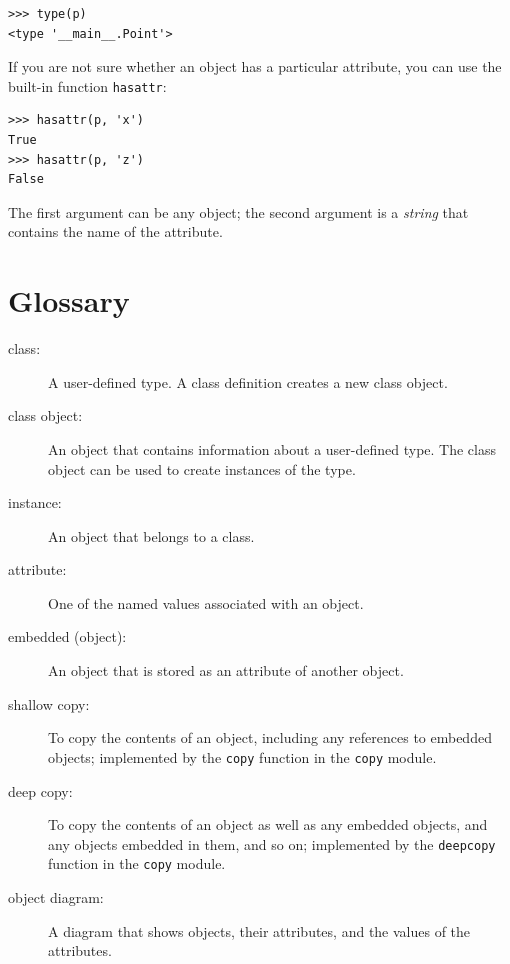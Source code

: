 \documentclass[10pt]{book}
\begin{document}
\beforeverb
\begin{verbatim}
>>> type(p)
<type '__main__.Point'>
\end{verbatim}
\afterverb
%
If you are not sure whether an object has a particular attribute,
you can use the built-in function {\tt hasattr}:


\beforeverb
\begin{verbatim}
>>> hasattr(p, 'x')
True
>>> hasattr(p, 'z')
False
\end{verbatim}
\afterverb
%
The first argument can be any object; the second argument is a {\em
string} that contains the name of the attribute.


\section{Glossary}

\begin{description}

\item[class:] A user-defined type.  A class definition creates a new
class object.

\item[class object:] An object that contains information about a
user-defined type.  The class object can be used to create instances
of the type.

\item[instance:] An object that belongs to a class.

\item[attribute:] One of the named values associated with an object.

\item[embedded (object):] An object that is stored as an attribute
of another object.

\item[shallow copy:] To copy the contents of an object, including
any references to embedded objects;
implemented by the {\tt copy} function in the {\tt copy} module.

\item[deep copy:] To copy the contents of an object as well as any
embedded objects, and any objects embedded in them, and so on;
implemented by the {\tt deepcopy} function in the {\tt copy} module.

\item[object diagram:] A diagram that shows objects, their
attributes, and the values of the attributes.

\end{description}
\end{document}
